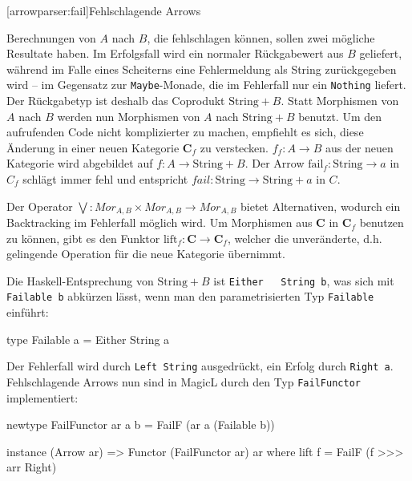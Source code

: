 \documentclass[12pt, a4paper, bibgerm]{scrbook}
\newenvironment{DIFnomarkup}{}{}
\newcommand\icode[1]{\lstinline?#1?}
\newcommand\lsection{}
\newcommand\ato{\rightarrow} %
\begin{document}
\lsection[arrowparser:fail]{Fehlschlagende Arrows}

Berechnungen von $A$ nach $B$, die fehlschlagen können, sollen zwei
mögliche Resultate haben. Im Erfolgsfall wird ein normaler Rückgabewert
aus $B$ geliefert, während im Falle eines Scheiterns eine Fehlermeldung
als String zurückgegeben wird -- im Gegensatz zur \icode{Maybe}-Monade,
die im Fehlerfall nur ein \icode{Nothing} liefert. Der Rückgabetyp ist
deshalb das Coprodukt $\mathrm{String}+B$. Statt Morphismen von $A$ nach
$B$ werden nun Morphismen von $A$ nach $\mathrm{String}+B$ benutzt. Um
den aufrufenden Code nicht komplizierter zu machen, empfiehlt es sich,
diese Änderung in einer neuen Kategorie $\mathbf{C}_f$ zu
verstecken. $f_{f} : A \rightarrow B$ aus der neuen Kategorie wird
abgebildet auf $f : A \rightarrow \mathrm{String} + B$. Der Arrow
$\mathrm{fail}_{f} : \mathrm{String} \rightarrow a$ in $C_{f}$ schlägt
immer fehl und entspricht $fail : \mathrm{String} \rightarrow
\mathrm{String} + a$ in $C$.

Der Operator $\bigvee : Mor_{A,B} \times Mor_{A,B}
\rightarrow Mor_{A,B} $ bietet Alternativen, wodurch ein Backtracking im
Fehlerfall möglich wird. Um Morphismen aus
$\mathbf{C}$ in $\mathbf{C}_f$ benutzen zu können, gibt es den Funktor
$\mathrm{lift}_f:\mathbf{C} \ato \mathbf{C}_f$, welcher die
unveränderte, d.h. gelingende Operation für die neue Kategorie
übernimmt.

Die Haskell-Entsprechung von $\mathrm{String}+B$ ist \icode{Either
  String b}, was sich mit \icode{Failable b} abkürzen lässt, wenn man
den parametrisierten Typ \icode{Failable} einführt:

\begin{DIFnomarkup}\begin{code}
type Failable a = Either String a
\end{code}\end{DIFnomarkup}

Der Fehlerfall wird durch \icode{Left String} ausgedrückt, ein Erfolg
durch \icode{Right a}. Fehlschlagende Arrows nun sind in MagicL durch den
Typ \icode{FailFunctor} implementiert:

\begin{DIFnomarkup}\begin{code}
newtype FailFunctor ar a b = FailF (ar a (Failable b))

instance (Arrow ar) => Functor (FailFunctor ar) ar where
    lift f = FailF (f >>> arr Right)
\end{code}\end{DIFnomarkup} %
\end{document}
